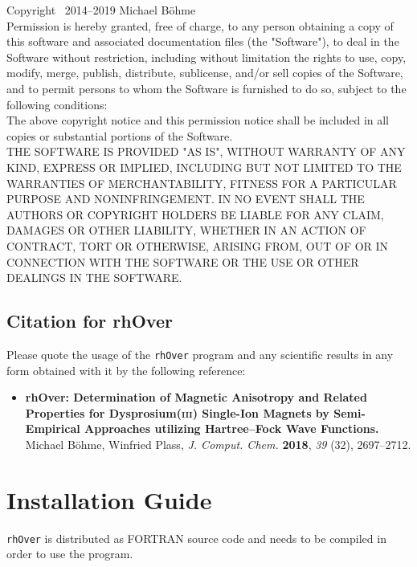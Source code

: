 \documentclass[11pt]{article}
\begin{document}
\noindent
Copyright \textcopyright~2014--2019 Michael Böhme \\

\noindent
Permission is hereby granted, free of charge, to any person obtaining a copy
of this software and associated documentation files (the "Software"), to deal
in the Software without restriction, including without limitation the rights
to use, copy, modify, merge, publish, distribute, sublicense, and/or sell
copies of the Software, and to permit persons to whom the Software is
furnished to do so, subject to the following conditions: \\

\noindent
The above copyright notice and this permission notice shall be included in all
copies or substantial portions of the Software. \\

\noindent
THE SOFTWARE IS PROVIDED "AS IS", WITHOUT WARRANTY OF ANY KIND, EXPRESS OR
IMPLIED, INCLUDING BUT NOT LIMITED TO THE WARRANTIES OF MERCHANTABILITY,
FITNESS FOR A PARTICULAR PURPOSE AND NONINFRINGEMENT. IN NO EVENT SHALL THE
AUTHORS OR COPYRIGHT HOLDERS BE LIABLE FOR ANY CLAIM, DAMAGES OR OTHER
LIABILITY, WHETHER IN AN ACTION OF CONTRACT, TORT OR OTHERWISE, ARISING FROM,
OUT OF OR IN CONNECTION WITH THE SOFTWARE OR THE USE OR OTHER DEALINGS IN THE
SOFTWARE. 

\clearpage
\subsection{Citation for rhOver}

Please quote the usage of the \texttt{rhOver} program and any scientific results in any form obtained with it by the following reference:

\begin{itemize}
 \item \textbf{rhOver: Determination of Magnetic Anisotropy and Related Properties for Dysprosium(\textsc{iii}) Single-Ion Magnets by Semi-Empirical Approaches utilizing Hartree--Fock Wave Functions.} Michael Böhme, Winfried Plass, \textit{J. Comput. Chem.} \textbf{2018}, \emph{39} (32), 2697--2712.
\end{itemize}

\clearpage
\section{Installation Guide}

\texttt{rhOver} is distributed as FORTRAN source code and needs to be compiled in order to use the program.
\end{document}
